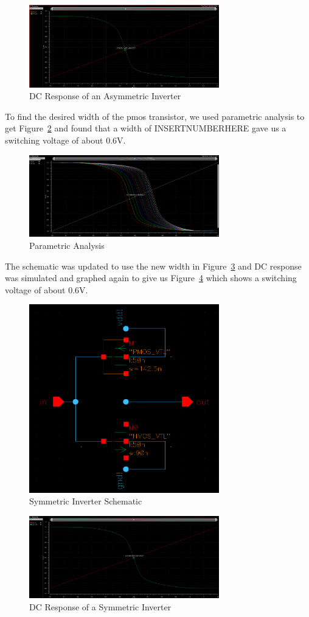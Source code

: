 \documentclass[12pt]{article}
\begin{document}
\begin{figure}[!htb]
  \centering
  \includegraphics[width=3.25in]{figures/asymmetric_dc.png}
  \caption{DC Response of an Asymmetric Inverter}\label{fig:asymm_dc}
\end{figure}
To find the desired width of the pmos transistor, we used parametric analysis to get Figure~\ref{fig:parametric} and found that a width of INSERTNUMBERHERE gave us a switching voltage of about 0.6V.
\begin{figure}[!htb]
  \centering
  \includegraphics[width=3.25in]{figures/parametric.png}
  \caption{Parametric Analysis}\label{fig:parametric}
\end{figure}
The schematic was updated to use the new width in Figure~\ref{fig:sym_schem} and DC response was simulated and graphed again to give us Figure~\ref{fig:sym_dc} which shows a switching voltage of about 0.6V.
\begin{figure}[!htb]
  \centering
  \includegraphics[width=3.25in]{figures/schematic.png}
  \caption{Symmetric Inverter Schematic}\label{fig:sym_schem}
\end{figure}
\begin{figure}[!htb]
  \centering
  \includegraphics[width=3.25in]{figures/symmetric_dc.png}
  \caption{DC Response of a Symmetric Inverter}\label{fig:sym_dc}
\end{figure}
\end{document}
